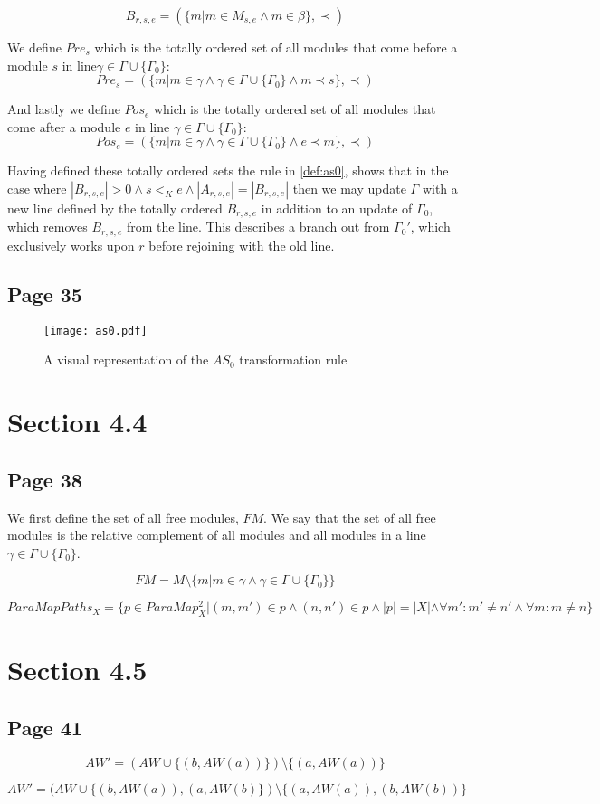 \[B_{r,s,e} = (\{m |m \in M_{s,e} \land m \in \beta\}, \prec)\]

We define $Pre_{s}$ which is the totally ordered set of all modules that come before a module $s$ in line$\gamma \in \Gamma \cup \{\Gamma_0\} $:
\[Pre_{s} = (\{m | m \in \gamma \land \gamma \in \Gamma \cup \{\Gamma_0\} \land m \prec s\}, \prec)\]

And lastly we define $Pos_{e}$ which is the totally ordered set of all modules that come after a module $e$  in line $\gamma \in \Gamma \cup \{\Gamma_0\} $:
\[Pos_{e} = (\{m | m \in \gamma \land \gamma \in \Gamma \cup \{\Gamma_0\} \land e \prec  m \}, \prec)\]

Having defined these totally ordered sets the rule in \cref{def:as0}, shows that in the case where $|B_{r,s,e}| > 0 \land s <_K e \land |A_{r,s,e}| = |B_{r,s,e}|$ then we may update $\Gamma$ with a new line defined by the totally  ordered $B_{r,s,e}$ in addition to an update of $\Gamma_0$, which removes $B_{r,s,e}$ from the line. This describes a branch out from $\Gamma_0'$, which exclusively works upon $r$ before rejoining with the old line. 

\subsection*{Page 35}
\begin{figure}[H]
\centering
\texttt{[image: as0.pdf]}
\caption{A visual representation of the $AS_0$ transformation rule}
\label{fig:as0}
\end{figure}

\section*{Section 4.4}
\subsection*{Page 38}
We first define the set of all free modules, $FM$. We say that the set of all free modules is the relative complement of all modules and all modules in a line $\gamma \in \Gamma \cup \{\Gamma_0\}$.

\[FM = M \setminus \{m | m \in \gamma \land \gamma \in \Gamma \cup \{\Gamma_0\}\}\]


\[ParaMapPaths_{X} = \{p \in ParaMap_{X}^2 | (m,m') \in p \land (n,n') \in p \land |p| = |X| \land  \forall m': m' \neq n' \land  \forall m: m \neq n \}\]

\section*{Section 4.5}
\subsection*{Page 41}
\[AW' = (AW \cup \{(b, AW(a))\}) \setminus \{(a, AW(a))\}\]

\[AW' = (AW \cup \{(b, AW(a)), (a, AW(b)\}) \setminus \{(a, AW(a)), (b, AW(b))\}\]

